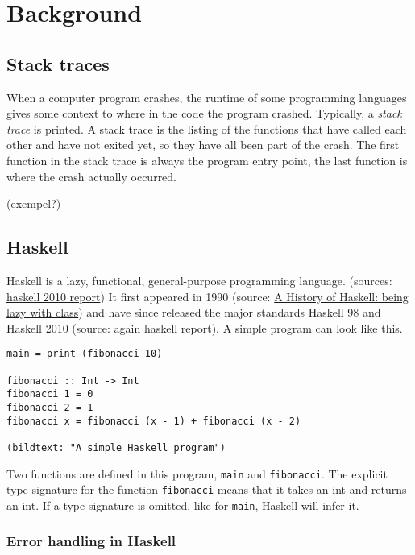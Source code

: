 \section{Background}

\subsection{Stack traces}

When a computer program crashes, the runtime of some programming languages
gives some context to where in the code the program crashed.
Typically, a \emph{stack trace} is printed. A stack trace is the listing
of the functions that have called each other and have not exited yet, so
they have all been part of the crash. The first function in the stack
trace is always the program entry point, the last function is where the
crash actually occurred.

(exempel?)

\subsection{Haskell}

Haskell is a lazy, functional, general-purpose programming language.
(sources: \href{http://www.haskell.org/onlinereport/haskell2010/haskellch1.html#x6-90001}{haskell 2010 report})
It first appeared in 1990 (source: \href{http://research.microsoft.com/en-us/um/people/simonpj/papers/history-of-haskell/}{A History of Haskell: being lazy with class}) and have since
released the major standards Haskell 98 and Haskell 2010
(source: again haskell report). A simple program can look like this.

\begin{verbatim}
main = print (fibonacci 10)

fibonacci :: Int -> Int
fibonacci 1 = 0
fibonacci 2 = 1
fibonacci x = fibonacci (x - 1) + fibonacci (x - 2)

(bildtext: "A simple Haskell program")
\end{verbatim}


Two functions are defined in this program, \texttt{main} and
\texttt{fibonacci}.  The explicit type signature for the function
\texttt{fibonacci} means that it takes an int and returns an int. If a type
signature is omitted, like for \texttt{main}, Haskell will infer it.

\subsubsection{Error handling in Haskell}


